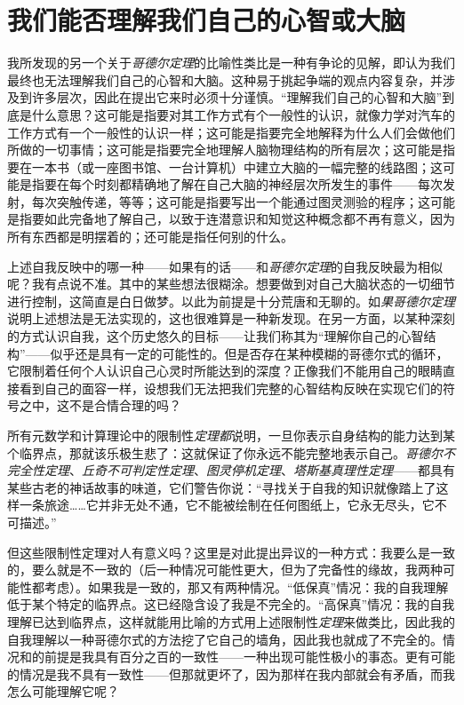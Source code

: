 \section{我们能否理解我们自己的心智或大脑}

我所发现的另一个关于\emph{哥德尔定理}的比喻性类比是一种有争论的见解，即认为我们最终也无法理解我们自己的心智和大脑。这种易于挑起争端的观点内容复杂，并涉及到许多层次，因此在提出它来时必须十分谨慎。“理解我们自己的心智和大脑”到底是什么意思？这可能是指要对其工作方式有个一般性的认识，就像力学对汽车的工作方式有一个一般性的认识一样；这可能是指要完全地解释为什么人们会做他们所做的一切事情；这可能是指要完全地理解人脑物理结构的所有层次；这可能是指要在一本书（或一座图书馆、一台计算机）中建立大脑的一幅完整的线路图；这可能是指要在每个时刻都精确地了解在自己大脑的神经层次所发生的事件——每次发射，每次突触传递，等等；这可能是指要写出一个能通过图灵测验的程序；这可能是指要如此完备地了解自己，以致于连潜意识和知觉这种概念都不再有意义，因为所有东西都是明摆着的；还可能是指任何别的什么。

上述自我反映中的哪一种——如果有的话——和\emph{哥德尔定理}的自我反映最为相似呢？我有点说不准。其中的某些想法很糊涂。想要做到对自己大脑状态的一切细节进行控制，这简直是白日做梦。以此为前提是十分荒唐和无聊的。如\emph{果哥德尔定理}说明上述想法是无法实现的，这也很难算是一种新发现。在另一方面，以某种深刻的方式认识自我，这个历史悠久的目标——让我们称其为“理解你自己的心智结构”——似乎还是具有一定的可能性的。但是否存在某种模糊的哥德尔式的循环，它限制着任何个人认识自己心灵时所能达到的深度？正像我们不能用自己的眼睛直接看到自己的面容一样，设想我们无法把我们完整的心智结构反映在实现它们的符号之中，这不是合情合理的吗？

所有元数学和计算理论中的限制性\emph{定理都}说明，一旦你表示自身结构的能力达到某个临界点，那就该乐极生悲了：这就保证了你永远不能完整地表示自己。\emph{哥德尔不完全性定理}、\emph{丘奇不可判定性定理}、\emph{图灵停机定理}、\emph{塔斯基真理性定理}——都具有某些古老的神话故事的味道，它们警告你说：“寻找关于自我的知识就像踏上了这样一条旅途……它并非无处不通，它不能被绘制在任何图纸上，它永无尽头，它不可描述。”

但这些限制性定理对人有意义吗？这里是对此提出异议的一种方式：我要么是一致的，要么就是不一致的（后一种情况可能性更大，但为了完备性的缘故，我两种可能性都考虑）。如果我是一致的，那又有两种情况。“低保真”情况：我的自我理解低于某个特定的临界点。这已经隐含设了我是不完全的。“高保真”情况：我的自我理解已达到临界点，这样就能用比喻的方式用上述限制性\emph{定理}来做类比，因此我的自我理解以一种哥德尔式的方法挖了它自己的墙角，因此我也就成了不完全的。情况和的前提是我具有百分之百的一致性——一种出现可能性极小的事态。更有可能的情况是我不具有一致性——但那就更坏了，因为那样在我内部就会有矛盾，而我怎么可能理解它呢？

